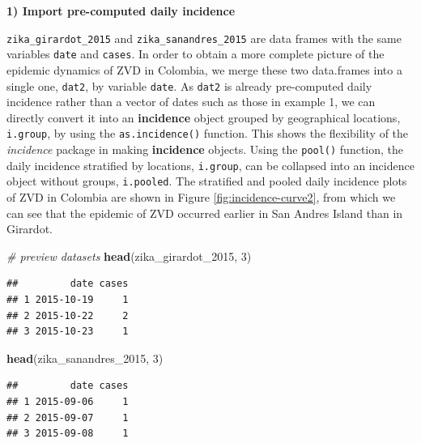 \documentclass[9pt,a4paper]{extarticle}
\newenvironment{Shaded}{\begin{snugshade}}{\end{snugshade}}
\newcommand{\CommentTok}[1]{\textcolor[rgb]{0.56,0.35,0.01}{\textit{#1}}}
\newcommand{\DecValTok}[1]{\textcolor[rgb]{0.00,0.00,0.81}{#1}}
\newcommand{\KeywordTok}[1]{\textcolor[rgb]{0.13,0.29,0.53}{\textbf{#1}}}
\newcommand{\NormalTok}[1]{#1}
\begin{document}
\textbf{1) Import pre-computed daily incidence}

\texttt{zika\_girardot\_2015} and \texttt{zika\_sanandres\_2015} are data frames with the same variables \texttt{date} and \texttt{cases}.
In order to obtain a more complete picture of the epidemic dynamics of ZVD in Colombia, we merge these two data.frames into a single one, \texttt{dat2}, by variable \texttt{date}.
As \texttt{dat2} is already pre-computed daily incidence rather than a vector of dates such as those in example 1, we can directly convert it into an \textbf{incidence} object grouped by geographical locations, \texttt{i.group}, by using the \texttt{as.incidence()} function.
This shows the flexibility of the \textit{incidence} package in making \textbf{incidence} objects.
Using the \texttt{pool()} function, the daily incidence stratified by locations, \texttt{i.group}, can be collapsed into an incidence object without groups, \texttt{i.pooled}.
The stratified and pooled daily incidence plots of ZVD in Colombia are shown in Figure \ref{fig:incidence-curve2}, from which we can see that the epidemic of ZVD occurred earlier in San Andres Island than in Girardot.


\begin{Shaded}
\begin{Highlighting}[]
\CommentTok{# preview datasets}
\KeywordTok{head}\NormalTok{(zika_girardot_2015, }\DecValTok{3}\NormalTok{)}
\end{Highlighting}
\end{Shaded}

\begin{verbatim}
##         date cases
## 1 2015-10-19     1
## 2 2015-10-22     2
## 3 2015-10-23     1
\end{verbatim}

\begin{Shaded}
\begin{Highlighting}[]
\KeywordTok{head}\NormalTok{(zika_sanandres_2015, }\DecValTok{3}\NormalTok{)}
\end{Highlighting}
\end{Shaded}

\begin{verbatim}
##         date cases
## 1 2015-09-06     1
## 2 2015-09-07     1
## 3 2015-09-08     1
\end{verbatim}
\end{document}
